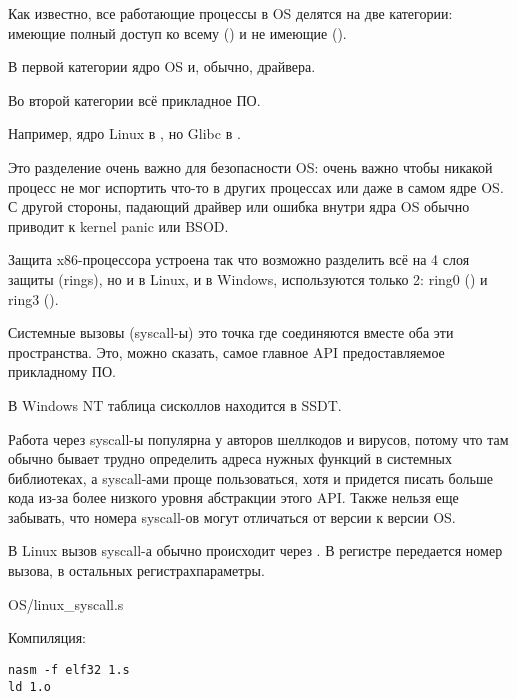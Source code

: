 
\label{syscalls}

Как известно, все работающие процессы в \ac{OS} делятся на две категории:
имеющие полный доступ ко всему  () 
и не имеющие ().

В первой категории ядро \ac{OS} и, обычно, драйвера.

Во второй категории всё прикладное ПО.


Например, ядро Linux в , но Glibc в .

Это разделение очень важно для безопасности \ac{OS}:
очень важно чтобы никакой процесс не мог испортить что-то в других процессах
или даже в самом ядре \ac{OS}.
С другой стороны, падающий драйвер или ошибка внутри ядра \ac{OS} обычно приводит к kernel panic или \ac{BSOD}.

Защита x86-процессора устроена так что возможно разделить всё на 4 слоя защиты (rings), но и в Linux,
и в Windows, используются только 2: ring0 () и ring3 ().

Системные вызовы (syscall-ы)
это точка где соединяются вместе оба эти пространства.
Это, можно сказать, самое главное \ac{API} предоставляемое прикладному ПО.

В \gls{Windows NT} таблица сисколлов находится в \ac{SSDT}.

Работа через syscall-ы популярна у авторов шеллкодов и вирусов,
потому что там обычно бывает трудно определить адреса нужных функций в системных библиотеках,
а syscall-ами проще пользоваться, хотя и придется писать больше
кода из-за более низкого уровня абстракции этого \ac{API}.
Также нельзя еще забывать, что номера syscall-ов могут отличаться от версии к версии OS.

\label{linux_syscall}

В Linux вызов syscall-а обычно происходит через .
В регистре \EAX передается номер вызова,
в остальных регистрах\EMDASH{}параметры.


{OS/linux_syscall.s}

Компиляция:

\begin{lstlisting}
nasm -f elf32 1.s
ld 1.o
\end{lstlisting}

